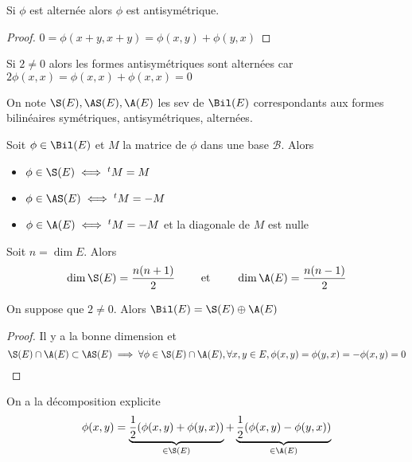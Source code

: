 \begin{lmm}
Si $\phi$ est alternée alors  $\phi$ est antisymétrique.
\end{lmm}

\begin{proof}
    $0=\phi(x + y, x+y)=\phi(x, y)+\phi(y, x)$
\end{proof}

\begin{rem}
    Si $2\neq 0$ alors les formes antisymétriques sont alternées car  $2\phi(x, x)=\phi(x, x)+\phi(x, x)=0$
\end{rem}

\begin{rem}
    On note $\S(E), \AS(E), \A(E)$ les sev de  $\Bil(E)$ correspondants aux formes bilinéaires symétriques, antisymétriques, alternées.
\end{rem}

\begin{prop}
    Soit $\phi \in  \Bil(E)$ et $M$ la matrice de  $\phi$ dans une base  $\mathcal  B$. Alors \begin{itemize}
        \item $\phi \in  \S(E) \iff  \transpose M=M$
        \item $\phi \in  \AS(E) \iff  \transpose M=-M$
        \item $\phi \in  \A(E) \iff  \transpose M=-M$ et la diagonale de $M$ est nulle
    \end{itemize}
\end{prop}

\begin{prop}
Soit $n=\dim E$. Alors \[
    \dim \S(E)= \frac{n(n+1)}{2}\qquad \text{ et }\qquad  \dim \A(E)= \frac{n(n-1)}{2}
\]
\end{prop}

\begin{prop}
    On suppose que $2\neq 0$. Alors  $\Bil(E)=\S(E)\oplus \A(E)$
\end{prop}

\begin{proof}
    Il y a la bonne dimension et  \[\S(E)\cap \A(E)\subset \AS(E) \implies \forall  \phi \in  \S(E)\cap \A(E), \forall  x, y \in  E, \phi(x,y)=\phi(y,x)=-\phi(x,y)=0\]
\end{proof}

\begin{rem}
On a la décomposition explicite \[
    \phi(x, y)=\underbrace{\frac12(\phi(x, y)+\phi(y, x))}_{\in \S(E)}+\underbrace{\frac12(\phi(x, y)-\phi(y, x))}_{\in \A(E)}
\] 
\end{rem}

